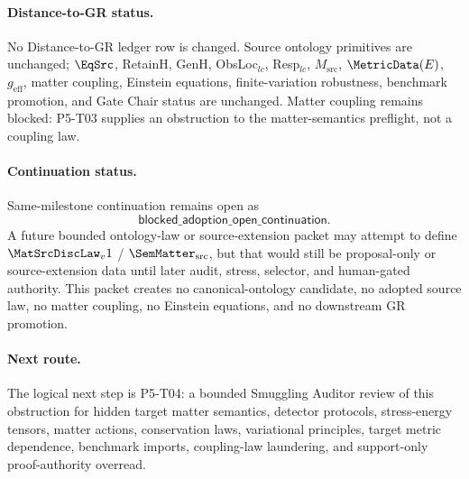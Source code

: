 \paragraph{Distance-to-GR status.}
No Distance-to-GR ledger row is changed.  Source ontology primitives are
unchanged; \(\EqSrc\), RetainH, GenH, ObsLoc\(_{lc}\), Resp\(_{lc}\),
\(M_{\mathrm{src}}\), \(\MetricData(E)\), \(g_{\mathrm{eff}}\), matter
coupling, Einstein equations, finite-variation robustness, benchmark
promotion, and Gate Chair status are unchanged.  Matter coupling remains
blocked: P5-T03 supplies an obstruction to the matter-semantics preflight,
not a coupling law.

\paragraph{Continuation status.}
Same-milestone continuation remains open as
\[
  \mathsf{blocked\_adoption\_open\_continuation}.
\]
A future bounded ontology-law or source-extension packet may attempt to define
\(\MatSrcDiscLaw_v1\) / \(\SemMatter_{\mathrm{src}}\), but that would still be
proposal-only or source-extension data until later audit, stress, selector,
and human-gated authority.  This packet creates no canonical-ontology
candidate, no adopted source law, no matter coupling, no Einstein equations,
and no downstream GR promotion.

\paragraph{Next route.}
The logical next step is P5-T04: a bounded Smuggling Auditor review of this
obstruction for hidden target matter semantics, detector protocols,
stress-energy tensors, matter actions, conservation laws, variational
principles, target metric dependence, benchmark imports, coupling-law
laundering, and support-only proof-authority overread.
